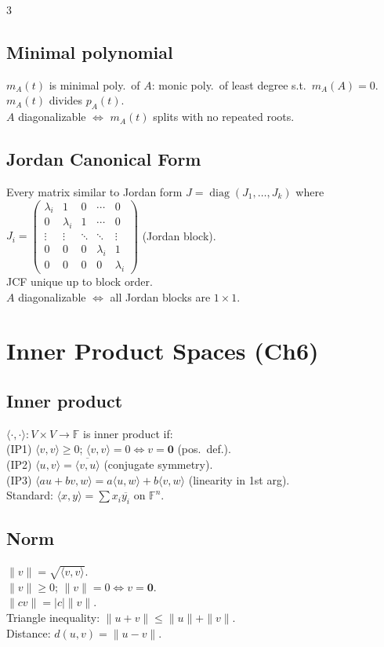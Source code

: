 \documentclass[10pt]{article}
\newcommand{\F}{\mathbb{F}}
\newcommand{\diag}{\operatorname{diag}}
\begin{document}
\begin{multicols}{3}
\subsection*{Minimal polynomial}
$m_A(t)$ is minimal poly.\ of $A$: monic poly.\ of least degree s.t.\ $m_A(A)=0$.\\
$m_A(t)$ divides $p_A(t)$.\\
$A$ diagonalizable $\Leftrightarrow$ $m_A(t)$ splits with no repeated roots.

\subsection*{Jordan Canonical Form}
Every matrix similar to Jordan form $J=\diag(J_1,\ldots,J_k)$ where\\
$J_i=\begin{pmatrix}\lambda_i&1&0&\cdots&0\\0&\lambda_i&1&\cdots&0\\\vdots&\vdots&\ddots&\ddots&\vdots\\0&0&0&\lambda_i&1\\0&0&0&0&\lambda_i\end{pmatrix}$ (Jordan block).\\
JCF unique up to block order.\\
$A$ diagonalizable $\Leftrightarrow$ all Jordan blocks are $1\times1$.

\columnbreak

\section*{Inner Product Spaces (Ch6)}

\subsection*{Inner product}
$\langle\cdot,\cdot\rangle:V\times V\to\F$ is inner product if:\\
(IP1) $\langle v,v\rangle\ge0$; $\langle v,v\rangle=0\Leftrightarrow v=\bm{0}$ (pos.\ def.).\\
(IP2) $\langle u,v\rangle=\overline{\langle v,u\rangle}$ (conjugate symmetry).\\
(IP3) $\langle au+bv,w\rangle=a\langle u,w\rangle+b\langle v,w\rangle$ (linearity in 1st arg).\\
Standard: $\langle x,y\rangle=\sum x_i\overline{y_i}$ on $\F^n$.

\subsection*{Norm}
$\|v\|=\sqrt{\langle v,v\rangle}$.\\
$\|v\|\ge0$; $\|v\|=0\Leftrightarrow v=\bm{0}$.\\
$\|cv\|=|c|\|v\|$.\\
Triangle inequality: $\|u+v\|\le\|u\|+\|v\|$.\\
Distance: $d(u,v)=\|u-v\|$.


\end{multicols}
\end{document}
